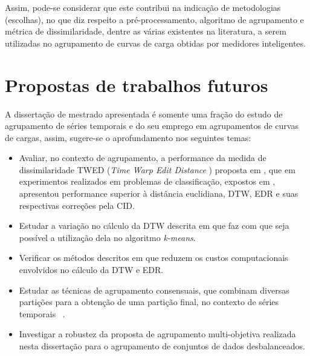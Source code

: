 Assim, pode-se considerar que este contribui na indicação de metodologias (escolhas), no que diz respeito a pré-processamento, algoritmo de agrupamento e métrica de dissimilaridade, dentre as várias existentes na literatura, a serem utilizadas no agrupamento de curvas de carga obtidas por medidores inteligentes.

\section{Propostas de trabalhos futuros}

A dissertação de mestrado apresentada é somente uma fração do estudo de agrupamento de séries temporais e do seu emprego em agrupamentos de curvas de cargas, assim, sugere-se o aprofundamento nos seguintes temas:

\begin{itemize}
	\item Avaliar, no contexto de agrupamento, a performance da medida de dissimilaridade TWED (\emph{Time Warp Edit Distance }) proposta em \parencite{10.1109/TPAMI.2008.76}, que em experimentos realizados em problemas de classificação, expostos em \parencite{Serra},  apresentou performance superior à distância euclidiana, DTW, EDR e suas respectivas correções pela CID.
	\item Estudar a variação no cálculo da DTW descrita em \parencite{Petitjean:2011:GAM:1890011.1890193} que faz com que seja possível a utilização dela no algoritmo \emph{k-means}.
	\item Verificar os métodos descritos em \parencite{Morse:2007:EAM:1247480.1247544} que reduzem os custos computacionais envolvidos no cálculo da DTW e EDR.
	\item Estudar as técnicas de agrupamento consensuais, que combinam diversas partições para a obtenção de uma partição final, no contexto de séries temporais ~\parencite{consenso}.
	\item Investigar a robustez da proposta de agrupamento multi-objetiva realizada nesta dissertação para o agrupamento de conjuntos de dados desbalanceados.
\end{itemize}